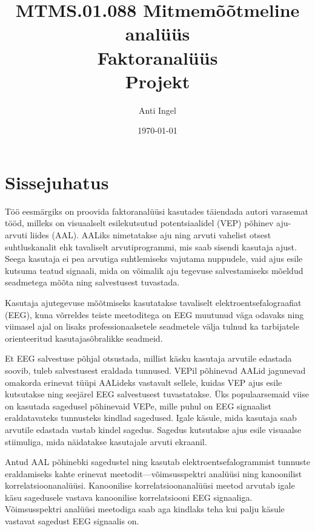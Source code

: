 \documentclass[a4paper,12pt]{report}
\begin{document}
\title{MTMS.01.088 Mitmemõõtmeline analüüs\\Faktoranalüüs\\Projekt}%
\author{Anti Ingel}%

\date{\today}
\maketitle

\chapter{Sissejuhatus}


Töö eesmärgiks on proovida faktoranalüüsi kasutades täiendada autori varasemat tööd, milleks on visuaalselt esilekutsutud potentsiaalidel (VEP) põhinev aju-arvuti liides (AAL). AALiks nimetatakse aju ning arvuti vahelist otsest suhtluskanalit ehk tavaliselt arvutiprogrammi, mis saab sisendi kasutaja ajust. Seega kasutaja ei pea arvutiga suhtlemiseks vajutama nuppudele, vaid ajus esile kutsuma teatud signaali, mida on võimalik aju tegevuse salvestamiseks mõeldud seadmetega mõõta ning salvestusest tuvastada.

Kasutaja ajutegevuse mõõtmiseks kasutatakse tavaliselt elektroentsefalograafiat (EEG), kuna võrreldes teiste meetoditega on EEG muutunud väga odavaks ning viimasel ajal on lisaks professionaalsetele seadmetele välja tulnud ka tarbijatele orienteeritud kasutajasõbralikke seadmeid.

Et EEG salvestuse põhjal otsustada, millist käsku kasutaja arvutile edastada soovib, tuleb salvestusest eraldada tunnused. VEPil põhinevad AALid jagunevad omakorda erinevat tüüpi AALideks vastavalt sellele, kuidas VEP ajus esile kutsutakse ning seejärel EEG salvestusest tuvastatakse. Üks populaarsemaid viise on kasutada sagedusel põhinevaid VEPe, mille puhul on EEG signaalist eraldatavateks tunnusteks kindlad sagedused. Igale käsule, mida kasutaja saab arvutile edastada vastab kindel sagedus. Sagedus kutsutakse ajus esile visuaalse stiimuliga, mida näidatakse kasutajale arvuti ekraanil.

Antud AAL põhinebki sagedustel ning kasutab elektroentsefalogrammist tunnuste eraldamiseks kahte erinevat meetodit---võimsusspektri analüüsi ning kanoonilist korrelatsioonanalüüsi. Kanoonilise korrelatsioonanalüüsi meetod arvutab igale käsu sagedusele vastava kanoonilise korrelatsiooni EEG signaaliga. Võimsusspektri analüüsi meetodiga saab aga kindlaks teha kui palju käsule vastavat sagedust EEG signaalis on.
\end{document}
